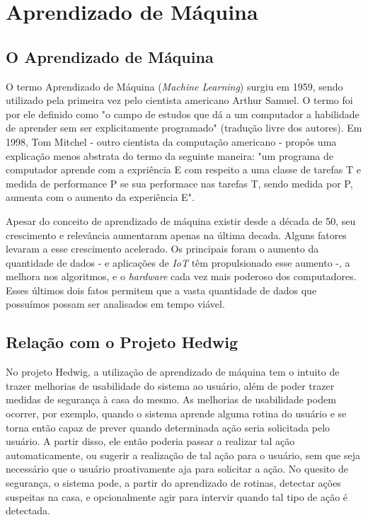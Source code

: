 \chapter{Aprendizado de Máquina}

\section{O Aprendizado de Máquina}
O termo Aprendizado de Máquina (\emph{Machine Learning}) surgiu em 1959, sendo utilizado pela primeira vez  pelo cientista americano Arthur Samuel. O termo foi por ele definido como "o campo de estudos que dá a um computador a habilidade de aprender sem ser explicitamente programado" (tradução livre dos autores). Em 1998, Tom Mitchel - outro cientista da computação americano - propôs uma explicação menos abstrata do termo da seguinte maneira: "um programa de computador aprende com a expriência E com respeito a uma classe de tarefas T e medida de performance P se sua performace nas tarefas T, sendo medida por P, aumenta com o aumento da experiência E".

Apesar do conceito de aprendizado de máquina existir desde a década de 50, seu crescimento e relevância aumentaram apenas na última decada. Alguns fatores levaram a esse crescimento acelerado. Os principais foram o aumento da quantidade de dados - e aplicações de \emph{IoT} têm propulsionado esse aumento -, a melhora nos algoritmos, e o \emph{hardware} cada vez mais poderoso dos computadores. Esses últimos dois fatos permitem que a vasta quantidade de dados que possuímos possam ser analisados em tempo viável.

\section{Relação com o Projeto Hedwig}
No projeto Hedwig, a utilização de aprendizado de máquina tem o intuito de trazer melhorias de usabilidade do sistema ao usuário, além de poder trazer medidas de segurança à casa do mesmo. As melhorias de usabilidade podem ocorrer, por exemplo, quando o sistema aprende alguma rotina do usuário e se torna então capaz de prever quando determinada ação seria solicitada pelo usuário. A partir disso, ele então poderia passar a realizar tal ação automaticamente, ou sugerir a realização de tal ação para o usuário, sem que seja necessário que o usuário proativamente aja para solicitar a ação. No quesito de segurança, o sistema pode, a partir do aprendizado de rotinas, detectar ações suspeitas na casa, e opcionalmente agir para intervir quando tal tipo de ação é detectada.

